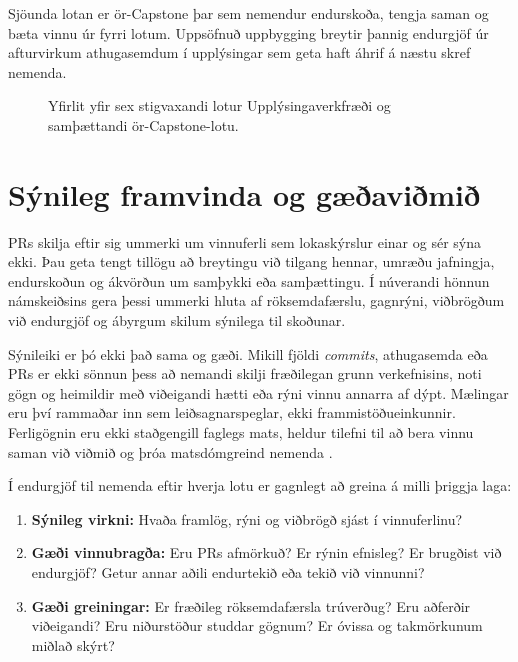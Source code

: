 \documentclass{kennsluakademia_conf}
\begin{document}
Sjöunda lotan er ör-Capstone þar sem nemendur endurskoða, tengja saman
og bæta vinnu úr fyrri lotum. Uppsöfnuð uppbygging breytir þannig
endurgjöf úr afturvirkum athugasemdum í upplýsingar sem geta haft áhrif
á næstu skref nemenda.

\begin{figure}[t]
\centering

\caption{Yfirlit yfir sex stigvaxandi lotur Upplýsingaverkfræði og samþættandi ör-Capstone-lotu.}
\label{fig:progressive-modules}
\end{figure}

\section{Sýnileg framvinda og
gæðaviðmið}\label{suxfdnileg-framvinda-og-guxe6uxf0aviuxf0miuxf0}

PRs skilja eftir sig ummerki um vinnuferli sem lokaskýrslur einar og sér
sýna ekki. Þau geta tengt tillögu að breytingu við tilgang hennar,
umræðu jafningja, endurskoðun og ákvörðun um samþykki eða samþættingu. Í
núverandi hönnun námskeiðsins gera þessi ummerki hluta af
röksemdafærslu, gagnrýni, viðbrögðum við endurgjöf og ábyrgum skilum
sýnilega til skoðunar.

Sýnileiki er þó ekki það sama og gæði. Mikill fjöldi \emph{commits},
athugasemda eða PRs er ekki sönnun þess að nemandi skilji fræðilegan
grunn verkefnisins, noti gögn og heimildir með viðeigandi hætti eða rýni
vinnu annarra af dýpt. Mælingar eru því rammaðar inn sem
leiðsagnarspeglar, ekki frammistöðueinkunnir. Ferligögnin eru ekki
staðgengill faglegs mats, heldur tilefni til að bera vinnu saman við
viðmið og þróa matsdómgreind nemenda
\citep{TaiEtAl2018EvaluativeJudgement}.

Í endurgjöf til nemenda eftir hverja lotu er gagnlegt að greina á milli
þriggja laga:

\begin{enumerate}
\def\labelenumi{\arabic{enumi}.}
\item
  \textbf{Sýnileg virkni:} Hvaða framlög, rýni og viðbrögð sjást í
  vinnuferlinu?
\item
  \textbf{Gæði vinnubragða:} Eru PRs afmörkuð? Er rýnin efnisleg? Er
  brugðist við endurgjöf? Getur annar aðili endurtekið eða tekið við
  vinnunni?
\item
  \textbf{Gæði greiningar:} Er fræðileg röksemdafærsla trúverðug? Eru
  aðferðir viðeigandi? Eru niðurstöður studdar gögnum? Er óvissa og
  takmörkunum miðlað skýrt?
\end{enumerate}
\end{document}
